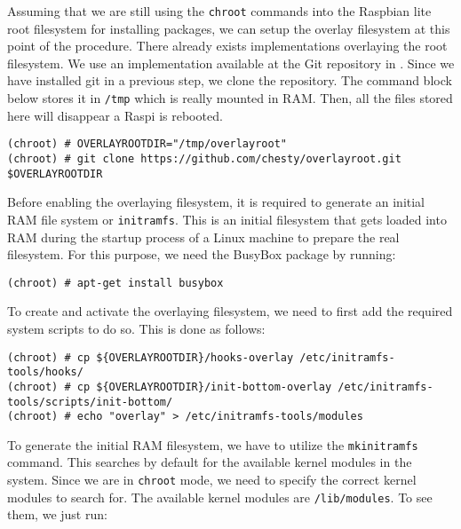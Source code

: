 Assuming that we are still using the \texttt{chroot} commands into the
Raspbian lite root filesystem for installing packages, we can setup the
overlay filesystem at this point of the procedure. There already exists
implementations overlaying the root filesystem. We use an implementation
available at the Git repository in \cite{overlayroot}. Since we have
installed git in a previous step, we clone the repository. The
command block below stores it in \texttt{/tmp} which is really mounted in
\ac{RAM}. Then, all the files stored here will disappear a \ac{Raspi} is
rebooted.

\begin{lstlisting}[]
(chroot) # OVERLAYROOTDIR="/tmp/overlayroot"
(chroot) # git clone https://github.com/chesty/overlayroot.git $OVERLAYROOTDIR
\end{lstlisting}
\FloatBarrier
\vspace{-5mm}

Before enabling the overlaying filesystem, it is required to generate
an initial \ac{RAM} file system or \texttt{initramfs}. This is an
initial filesystem that gets loaded into \ac{RAM} during the startup
process of a Linux machine to prepare the real filesystem. For this purpose,
we need the BusyBox package by running:

\begin{lstlisting}[]
(chroot) # apt-get install busybox
\end{lstlisting}
\FloatBarrier
\vspace{-5mm}

To create and activate the overlaying filesystem, we need to first
add the required system scripts to do so. This is done as follows:

\begin{lstlisting}[]
(chroot) # cp ${OVERLAYROOTDIR}/hooks-overlay /etc/initramfs-tools/hooks/
(chroot) # cp ${OVERLAYROOTDIR}/init-bottom-overlay /etc/initramfs-tools/scripts/init-bottom/
(chroot) # echo "overlay" > /etc/initramfs-tools/modules
\end{lstlisting}
\FloatBarrier
\vspace{-5mm}

To generate the initial \ac{RAM} filesystem, we have to utilize the
\texttt{mkinitramfs} command. This searches by default for the available
kernel modules in the system. Since we are in \texttt{chroot} mode, we need
to specify the correct kernel modules to search for. The available
kernel modules are \texttt{/lib/modules}. To see them, we just run:

